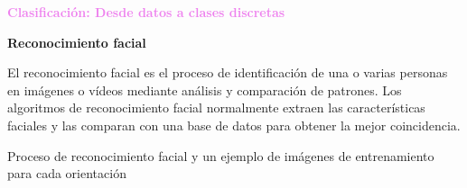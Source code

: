 \documentclass[11pt]{beamer}
\begin{document}
\begin{frame}{\textbf{\textcolor{violet}{Clasificaci\'on: Desde datos a clases discretas}} }
\vspace{0.2cm}
	
	\textbf{Reconocimiento facial}
	
\scriptsize{El reconocimiento facial es el proceso de identificaci\'on de una o varias personas en im\'agenes o v\'ideos mediante an\'alisis y comparaci\'on de patrones. Los algoritmos de reconocimiento facial normalmente extraen las caracter\'isticas faciales y las comparan con una base de datos para obtener la mejor coincidencia.

\vspace{0.3cm}

\tiny{Proceso de reconocimiento facial y un ejemplo de im\'agenes de entrenamiento para cada orientaci\'on}

\vspace{0.3cm}


}
\end{frame}
\end{document}
